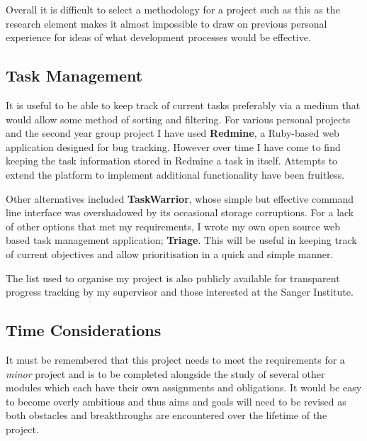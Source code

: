 Overall it is difficult to select a methodology for a project such as
this as the research element makes it almost impossible to draw on previous
personal experience for ideas of what development processes would be effective.


\subsection{Task Management}

It is useful to be able to keep track of current tasks preferably via a medium
that would allow some method of sorting and filtering. For various personal
projects and the second year group project I have used \textbf{Redmine}, a
Ruby-based web application designed for bug tracking. However over time I have
come to find keeping the task information stored in Redmine a task in itself.
Attempts to extend the platform to implement additional functionality have been
fruitless.

Other alternatives included \textbf{TaskWarrior}, whose simple but effective
command line interface was overshadowed by its occasional storage corruptions.
For a lack of other options that met my requirements, I wrote my own open source
web based task management application; \textbf{Triage}\citep{github:triage}.
This will be useful in keeping track of current objectives and allow
prioritisation in a quick and simple manner.

The list used to organise my project is also publicly available\citep{sam:triage}
for transparent progress tracking by my supervisor and those interested at the
Sanger Institute.


\subsection{Time Considerations}

It must be remembered that this project needs to meet the requirements for a
\textit{minor} project and is to be completed alongside the study of several
other modules which each have their own assignments and obligations. It would be
easy to become overly ambitious and thus aims and goals will need to be revised
as both obstacles and breakthroughs are encountered over the lifetime of the
project.

